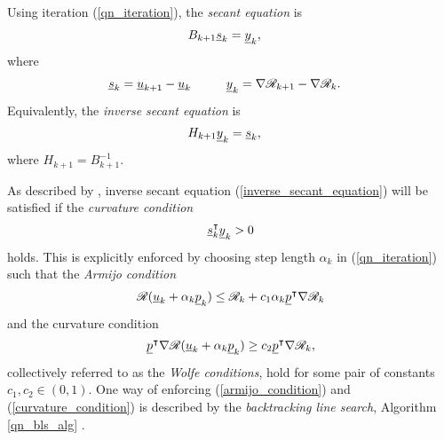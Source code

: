 Using iteration (\ref{qn_iteration}), the  \emph{secant equation} is
\begin{align}
  \label{secant_equation}
  B_{k+1} \underline{s}_k &= \underline{y}_k,
\end{align}
where
\begin{align*}
  \rankone{s}_k = \rankone{u}_{k+1} - \rankone{u}_k \hspace{10mm} \rankone{y}_k &= \nabla \mathscr{R}_{k+1} - \nabla \mathscr{R}_k.
\end{align*}
Equivalently, the \emph{inverse secant equation} is
\begin{align}
  \label{inverse_secant_equation}
  H_{k+1} \underline{y}_k &= \underline{s}_k,
\end{align}
where $H_{k+1} = B_{k+1}^{-1}$.

As described by \citet{nocedal_2000}, inverse secant equation (\ref{inverse_secant_equation}) will be satisfied if the \emph{curvature condition}
\begin{align*}
  \underline{s}_k^\intercal \underline{y}_k > 0
\end{align*} 
holds.  This is explicitly enforced by choosing step length $\alpha_k$ in (\ref{qn_iteration}) such that the  \emph{Armijo condition}
\begin{align}
  \label{armijo_condition}
  \mathscr{R}(\underline{u}_k + \alpha_k \underline{p}_k ) \leq \mathscr{R}_k + c_1 \alpha_k \underline{p}^\intercal \nabla \mathscr{R}_k
\end{align}
and the curvature condition 
\begin{align}
  \label{curvature_condition}
  \underline{p}^\intercal \nabla \mathscr{R}(\underline{u}_k + \alpha_k \underline{p}_k ) \geq c_2 \underline{p}^\intercal \nabla \mathscr{R}_k,
\end{align}
collectively referred to as the  \emph{Wolfe conditions}, hold for some pair of constants $c_1,c_2 \in (0,1)$.  One way of enforcing (\ref{armijo_condition}) and (\ref{curvature_condition}) is described by the  \emph{backtracking line search}, Algorithm \ref{qn_bls_alg} \citep{nocedal_2000}.

